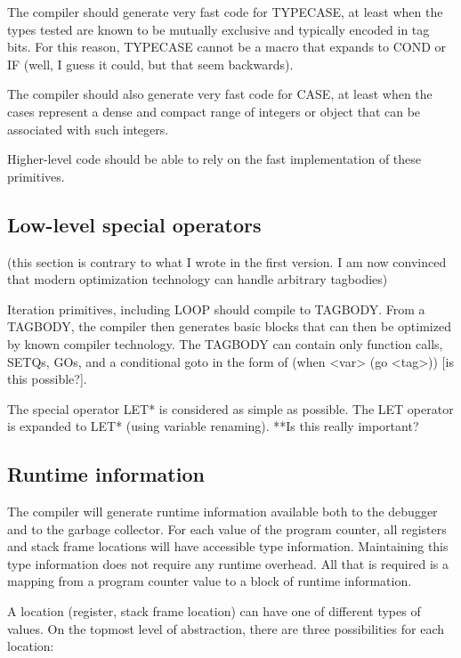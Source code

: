 \documentclass{article}
\begin{document}
The compiler should generate very fast code for TYPECASE, at least
when the types tested are known to be mutually exclusive and typically
encoded in tag bits.  For this reason, TYPECASE cannot be a macro that
expands to COND or IF (well, I guess it could, but that seem backwards).

The compiler should also generate very fast code for CASE, at least
when the cases represent a dense and compact range of integers or
object that can be associated with such integers.

Higher-level code should be able to rely on the fast implementation of
these primitives. 

\subsection{Low-level special operators}

(this section is contrary to what I wrote in the first version.  I am
now convinced that modern optimization technology can handle arbitrary
tagbodies)

Iteration primitives, including LOOP should compile to TAGBODY.  From
a TAGBODY, the compiler then generates basic blocks that can then be
optimized by known compiler technology.  The TAGBODY can contain only
function calls, SETQs, GOs, and a conditional goto in the form of
(when <var> (go <tag>)) [is this possible?].

The special operator LET* is considered as simple as possible.  The
LET operator is expanded to LET* (using variable renaming).  **Is this
really important?

\subsection{Runtime information}

The compiler will generate runtime information available both to the
debugger and to the garbage collector.  For each value of the program
counter, all registers and stack frame locations will have accessible
type information.  Maintaining this type information does not require
any runtime overhead.  All that is required is a mapping from a
program counter value to a block of runtime information. 

A location (register, stack frame location) can have one of different
types of values.  On the topmost level of abstraction, there are three
possibilities for each location:
\end{document}
